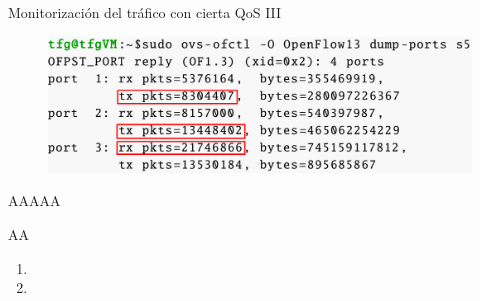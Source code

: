 \documentclass[10pt,spanish,xcolor={svgnames}]{beamer}
\newcommand{\nologo}{\setbeamertemplate{logo}{}} %
\begin{document}
{\nologo %
\begin{frame}{Monitorización del tráfico con cierta QoS III}
\begin{figure}[h!]
	\centering
	\includegraphics[width=1\textwidth]{Imagenes/dump_ports_balanceado.png}
\end{figure}

\note{\large \vfill
	\begin{center}
		\begin{enumerate}
			\item 
			\vspace{2em}	
			\item 
			\vspace{2em}
			\item 
			\vspace{2em}
			\vfill
		\end{enumerate}
\end{center}}
\end{frame}
} %






\begin{frame}{AAAAA}
\vspace*{-2em}
\begin{exampleblock}{AA}
\begin{enumerate}
\item
\vspace{1em}
\item\end{enumerate}
\end{exampleblock}
\note{\large \vfill
	\begin{center}
		\begin{enumerate}
			\item  
			\vspace{2em}	
			\item  
			\vspace{2em}
			\item  
			\vspace{2em}
			\vfill
		\end{enumerate}
\end{center}}
\end{frame}
\end{document}

